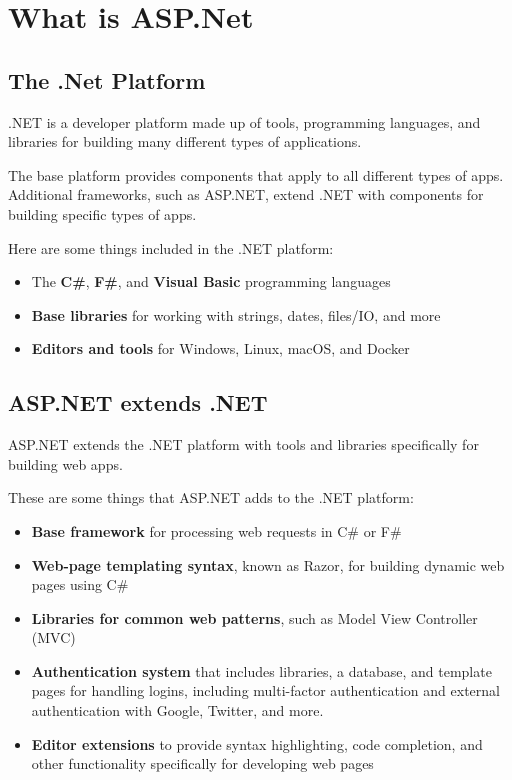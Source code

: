 \chapter{What is ASP.Net}

\section{The .Net Platform}
.NET is a developer platform made up of tools, programming languages, and libraries for building many different types of applications.

The base platform provides components that apply to all different types of apps. Additional frameworks, such as ASP.NET, extend .NET with components for building specific types of apps.

Here are some things included in the .NET platform:
\begin{itemize}
	\tightlist
	\item The \textbf{C\#}, \textbf{F\#}, and \textbf{Visual Basic} programming languages
	\item \textbf{Base libraries} for working with strings, dates, files/IO, and more
	\item \textbf{Editors and tools} for Windows, Linux, macOS, and Docker
\end{itemize}

\section{ASP.NET extends .NET}
ASP.NET extends the .NET platform with tools and libraries specifically for building web apps.

These are some things that ASP.NET adds to the .NET platform:
\begin{itemize}
	\tightlist
	\item \textbf{Base framework} for processing web requests in C\# or F\#
	\item \textbf{Web-page templating syntax}, known as Razor, for building dynamic web pages using C\#
	\item \textbf{Libraries for common web patterns}, such as Model View Controller (MVC)
	\item \textbf{Authentication system} that includes libraries, a database, and template pages for handling logins, including multi-factor authentication and external authentication with Google, Twitter, and more.
	\item \textbf{Editor extensions} to provide syntax highlighting, code completion, and other functionality specifically for developing web pages
\end{itemize}

